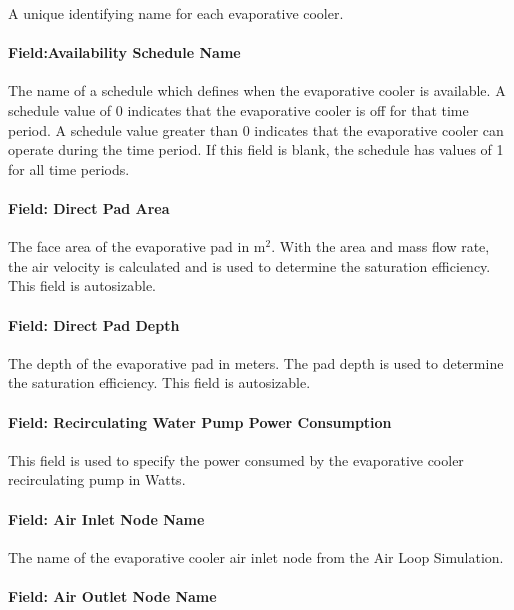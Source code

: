 A unique identifying name for each evaporative cooler.

\paragraph{Field:Availability Schedule Name}\label{fieldavailability-schedule-name}

The name of a schedule which defines when the evaporative cooler is available. A schedule value of 0 indicates that the evaporative cooler is off for that time period. A schedule value greater than 0 indicates that the evaporative cooler can operate during the time period. If this field is blank, the schedule has values of 1 for all time periods.

\paragraph{Field: Direct Pad Area}\label{field-direct-pad-area}

The face area of the evaporative pad in m\(^{2}\). With the area and mass flow rate, the air velocity is calculated and is used to determine the saturation efficiency. This field is autosizable.

\paragraph{Field: Direct Pad Depth}\label{field-direct-pad-depth}

The depth of the evaporative pad in meters. The pad depth is used to determine the saturation efficiency. This field is autosizable.

\paragraph{Field: Recirculating Water Pump Power Consumption}\label{field-recirculating-water-pump-power-consumption}

This field is used to specify the power consumed by the evaporative cooler recirculating pump in Watts.

\paragraph{Field: Air Inlet Node Name}\label{field-air-inlet-node-name-001}

The name of the evaporative cooler air inlet node from the Air Loop Simulation.

\paragraph{Field: Air Outlet Node Name}\label{field-air-outlet-node-name-001}

